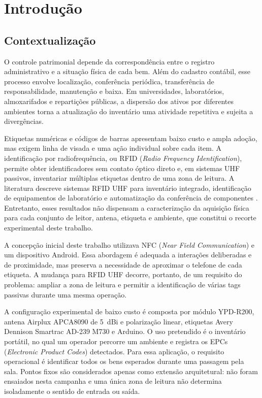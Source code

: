 %
%

\chapter{Introdução}
\label{cap:introducao}

\section{Contextualização}

O controle patrimonial depende da correspondência entre o registro administrativo e a situação física de cada bem. Além do cadastro contábil, esse processo envolve localização, conferência periódica, transferência de responsabilidade, manutenção e baixa. Em universidades, laboratórios, almoxarifados e repartições públicas, a dispersão dos ativos por diferentes ambientes torna a atualização do inventário uma atividade repetitiva e sujeita a divergências.

Etiquetas numéricas e códigos de barras apresentam baixo custo e ampla adoção, mas exigem linha de visada e uma ação individual sobre cada item. A identificação por radiofrequência, ou RFID (\textit{Radio Frequency Identification}), permite obter identificadores sem contato óptico direto e, em sistemas UHF passivos, inventariar múltiplas etiquetas dentro de uma zona de leitura. A literatura descreve sistemas RFID UHF para inventário integrado, identificação de equipamentos de laboratório e automatização da conferência de componentes \cite{chen2022inventory,ibrahim2018lab,iorga2026}. Entretanto, esses resultados não dispensam a caracterização da aquisição física para cada conjunto de leitor, antena, etiqueta e ambiente, que constitui o recorte experimental deste trabalho.

A concepção inicial deste trabalho utilizava NFC (\textit{Near Field Communication}) e um dispositivo Android. Essa abordagem é adequada a interações deliberadas e de proximidade, mas preserva a necessidade de aproximar o telefone de cada etiqueta. A mudança para RFID UHF decorre, portanto, de um requisito do problema: ampliar a zona de leitura e permitir a identificação de várias tags passivas durante uma mesma operação.

A configuração experimental de baixo custo é composta por módulo YPD-R200, antena Airplux APCA8090 de 5~dBi e polarização linear, etiquetas Avery Dennison Smartrac AD-239 M730 e Arduino. O uso pretendido é o inventário portátil, no qual um operador percorre um ambiente e registra os EPCs (\textit{Electronic Product Codes}) detectados. Para essa aplicação, o requisito operacional é identificar todos os bens esperados durante uma passagem pela sala. Pontos fixos são considerados apenas como extensão arquitetural: não foram ensaiados nesta campanha e uma única zona de leitura não determina isoladamente o sentido de entrada ou saída.

